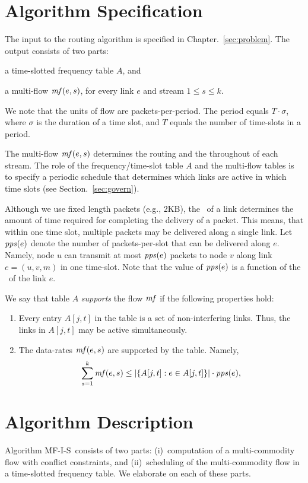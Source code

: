 \documentclass[12pt,oneside,english,a4paper]{book}
\theoremstyle{plain}
\theoremstyle{definition}
\theoremstyle{Theorem}
\theoremstyle{plain}
\newenvironment{proof sketch}[1]{\noindent {\emph{Proof sketch of #1:}}}{\hfill \qed}
\newcommand{\pps}{\text{\emph{pps}}}
\newcommand{\mf}{\text{\emph{mf}}}
\newcommand{\MCS}{\text{\sc{mcs}}}
\newcommand{\algA}{\textsc{MF-I-S}}
\begin{document}
\section{Algorithm Specification}
The input to the routing algorithm is specified in
Chapter.~\ref{sec:problem}.
The output consists of two parts:
\begin{inparaenum}[(i)]
\item a time-slotted frequency table $A$, and
\item a multi-flow $\mf(e,s)$, for every link $e$ and stream $1\leq
  s\leq k$.
\end{inparaenum}
We note that the units of flow are packets-per-period. The period
equals $T \cdot \sigma$, where $\sigma$ is the duration of a time
slot, and $T$ equals the number of time-slots in a period.

The multi-flow $\mf(e,s)$ determines the routing and the throughout of
each stream. The role of the frequency/time-slot table $A$ and the
multi-flow tables is to specify a periodic schedule that determines
which links are active in which time slots (see Section.~\ref{sec:govern}).

Although we use fixed length packets (e.g., 2KB), the \MCS\ of a link
determines the amount of time required for completing the delivery of
a packet.  This means, that within one time slot, multiple packets may
be delivered along a single link.  Let $\pps(e)$ denote the number of
packets-per-slot that can be delivered along $e$.  Namely, node $u$
can transmit at most $\pps(e)$ packets to node $v$ along link
$e=(u,v,m)$ in one time-slot. Note that the value of $\pps(e)$ is a function of
the \MCS\ of the link $e$.

\medskip \noindent We say that table $A$ \emph{supports} the flow
$\mf$ if the following properties hold:
\begin{enumerate}
\item Every entry $A[j,t]$ in the table is a set of non-interfering
  links. Thus, the links in $A[j,t]$
  may be active simultaneously.
\item The data-rates $\mf(e,s)$ are supported by the table. Namely,
  \begin{align}\label{eq:support}
    \sum_{s=1}^k \mf(e,s) \leq |\{A[j,t] : e\in A[j,t]\}|\cdot \pps(e),
  \end{align}
\end{enumerate}

\section{Algorithm Description} \label{sec:sched}
Algorithm \algA\ consists of two parts: (i)~computation of a
multi-commodity flow with conflict constraints, and (ii)~scheduling of
the multi-commodity flow in a time-slotted frequency table.
We elaborate on each of these parts.
\end{document}
